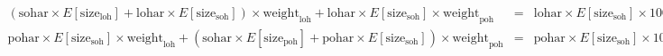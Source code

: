   \begin{eqnarray*}
    (\text{sohar} \times E[\text{size}_{\text{loh}}] + \text{lohar} \times E[\text{size}_{\text{soh}}]) \times \text{weight}_{\text{loh}} + \text{lohar} \times E[\text{size}_{\text{soh}}] \times \text{weight}_{\text{poh}} &=& \text{lohar} \times E[\text{size}_{\text{soh}}] \times 1000 \\
    \text{pohar} \times E[\text{size}_{\text{soh}}] \times \text{weight}_{\text{loh}} + (\text{sohar} \times E[\text{size}_{\text{poh}}]  + \text{pohar} \times E[\text{size}_{\text{soh}}]) \times \text{weight}_{\text{poh}} &=& \text{pohar} \times E[\text{size}_{\text{soh}}] \times 1000
  \end{eqnarray*}

